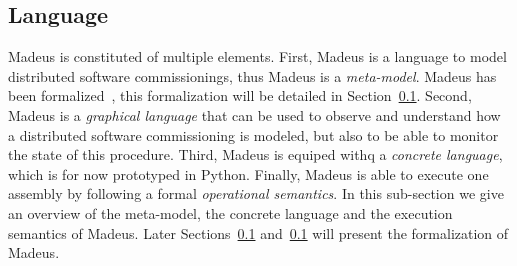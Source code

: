 \subsection{Language}


Madeus is constituted of multiple elements. First, Madeus is a
language to model distributed software commissionings, thus Madeus is
a \emph{meta-model}. Madeus has been formalized~\cite{}, this
formalization will be detailed in Section~\ref{}. Second, Madeus is a
\emph{graphical language} that can be used to observe and understand
how a distributed software commissioning is modeled, but also to be
able to monitor the state of this procedure. Third, Madeus is equiped withq a
\emph{concrete language}, which is for now prototyped in
Python. Finally, Madeus is able to execute one assembly by following a
formal \emph{operational semantics}. In this sub-section we give an
overview of the meta-model, the concrete language and the execution
semantics of Madeus. Later Sections~\ref{} and~\ref{} will present the
formalization of Madeus.



